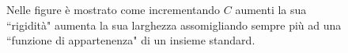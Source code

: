 \documentclass[12pt,italian]{report}
\begin{document}
\begin{figure}[h!]
	\centering
	\caption{Nelle figure è mostrato come incrementando $C$ aumenti la sua ``rigidità" aumenta la sua larghezza assomigliando sempre più ad una ``funzione di appartenenza" di un insieme standard.}
	\label{fig:possibilearn_c}
\end{figure}
\end{document}
